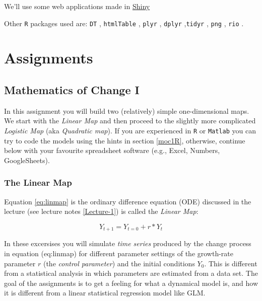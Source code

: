 \documentclass[]{book}
\let\stdsection\section
\renewcommand\section{\newpage\stdsection}
\begin{document}
We'll use some web applications made in
\href{http://shiny.rstudio.com}{Shiny} \citep{R-shiny}

Other \texttt{R} packages used are: \texttt{DT} \citep{R-DT},
\texttt{htmlTable} \citep{R-htmlTable}, \texttt{plyr} \citep{R-plyr},
\texttt{dplyr} \citep{R-dplyr},\texttt{tidyr} \citep{R-tidyr},
\texttt{png} \citep{R-png}, \texttt{rio} \citep{R-rio}.

\part{Assignments}\label{part-assignments}

\chapter{\texorpdfstring{\textbf{Mathematics of Change
I}}{Mathematics of Change I}}\label{moc1ass}

In this assignment you will build two (relatively) simple
one-dimensional maps. We start with the \emph{Linear Map} and then
proceed to the slightly more complicated \emph{Logistic Map} (aka
\emph{Quadratic map}). If you are experienced in \texttt{R} or
\texttt{Matlab} you can try to code the models using the hints in
section \ref{moc1R}, otherwise, continue below with your favourite
spreadsheet software (e.g., Excel, Numbers, GoogleSheets).

\section{The Linear Map}\label{the-linear-map}

Equation \eqref{eq:linmap} is the ordinary difference equation (ODE)
discussed in the lecture (see lecture notes \ref{Lecture-1}) is called
the \emph{Linear Map}:

\begin{equation}
Y_{t+1} = Y_{t=0} + r*Y_t
\label{eq:linmap}
\end{equation}

In these excersises you will simulate \emph{time series} produced by the
change process in equation (eq:linmap) for different parameter
settings of the growth-rate parameter \(r\) (the \emph{control
parameter}) and the initial conditions \(Y_0\). This is different from a
statistical analysis in which parameters are estimated from a data set.
The goal of the assignments is to get a feeling for what a dynamical
model is, and how it is different from a linear statistical regression
model like GLM.
\end{document}
